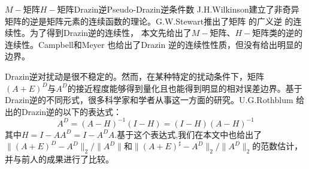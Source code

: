 
\begin{Cabstract}{$M-$矩阵}{$H-$矩阵}{Drazin逆}{Pseudo-Drazin逆}{条件数}
J.\nbs H.\nbs Wilkinson建立了非奇异矩阵的逆是矩阵元素的连续函数的理论。G.\nbs W.\nbs Stewart推出了矩阵 的广义逆 的连续性。为了得到Drazin逆的连续性， 本文先给出了$M-$矩阵、$H-$矩阵类的逆的连续性。Campbell和Meyer 也给出了Drazin 逆的连续性性质，但没有给出明显的边界。\par
Drazin逆对扰动是很不稳定的。然而，在某种特定的扰动条件下，矩阵$(A+E)^D$与$A^D$的接近程度能够得到量化且也能得到明显的相对误差边界。基于Drazin逆的不同形式，很多科学家和学者从事这一方面的研究。U.\nbs G.\nbs Rothblum 给出的Drazin逆的以下的表达式：
$$A^D=(A-H)^{-1}(I-H)=(I-H)(A-H)^{-1}$$
其中$H=I-AA^D=I-A^DA$.基于这个表达式,我们在本文中也给出了$\|(A+E)^D-A^D\|_2/\| A^D\|$和$\|(A+E)^\sharp-A^D\|_2/\|A^D\|_2$的范数估计，并与前人的成果进行了比较。
\end{Cabstract}

